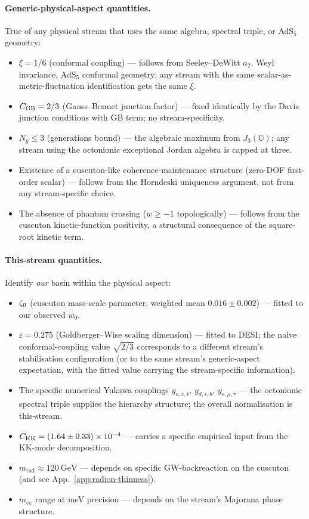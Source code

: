 \paragraph{Generic-physical-aspect quantities.}
True of any physical stream that uses the same algebra, spectral triple, or AdS$_5$ geometry:
\begin{itemize}\setlength{\itemsep}{0pt}
  \item $\xi = 1/6$ (conformal coupling) --- follows from Seeley--DeWitt $a_2$, Weyl invariance, AdS$_5$ conformal geometry; any stream with the same scalar-as-metric-fluctuation identification gets the same $\xi$.
  \item $C_{\mathrm{GB}} = 2/3$ (Gauss--Bonnet junction factor) --- fixed identically by the Davis junction conditions with GB term; no stream-specificity.
  \item $N_g \leq 3$ (generations bound) --- the algebraic maximum from $J_3(\mathbb{O})$; any stream using the octonionic exceptional Jordan algebra is capped at three.
  \item Existence of a cuscuton-like coherence-maintenance structure (zero-DOF first-order scalar) --- follows from the Horndeski uniqueness argument, not from any stream-specific choice.
  \item The absence of phantom crossing ($w \geq -1$ topologically) --- follows from the cuscuton kinetic-function positivity, a structural consequence of the square-root kinetic term.
\end{itemize}

\paragraph{This-stream quantities.}
Identify \emph{our} basin within the physical aspect:
\begin{itemize}\setlength{\itemsep}{0pt}
  \item $\zeta_0$ (cuscuton mass-scale parameter, weighted mean $0.016 \pm 0.002$) --- fitted to our observed $w_0$.
  \item $\varepsilon = 0.275$ (Goldberger--Wise scaling dimension) --- fitted to DESI; the naive conformal-coupling value $\sqrt{2/3}$ corresponds to a different stream's stabilisation configuration (or to the same stream's generic-aspect expectation, with the fitted value carrying the stream-specific information).
  \item The specific numerical Yukawa couplings $y_{u,c,t}$, $y_{d,s,b}$, $y_{e,\mu,\tau}$ --- the octonionic spectral triple supplies the hierarchy structure; the overall normalisation is this-stream.
  \item $C_{\mathrm{KK}} = (1.64 \pm 0.33)\times 10^{-4}$ --- carries a specific empirical input from the KK-mode decomposition.
  \item $m_\mathrm{rad} \approx 120~\mathrm{GeV}$ --- depends on specific GW-backreaction on the cuscuton (and see App.~\ref{app:radion-thinness}).
  \item $m_{ee}$ range at meV precision --- depends on the stream's Majorana phase structure.
\end{itemize}


